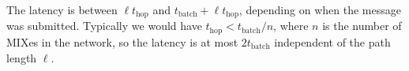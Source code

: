 \documentclass{llncs}
\begin{document}
The latency is between $\ell t_\mathrm{hop}$ and $t_\mathrm{batch} +
\ell t_\mathrm{hop}$, depending on when the message was submitted.
Typically we would have $t_\mathrm{hop} < t_\mathrm{batch}/n$, where
$n$ is the number of MIXes in the network, so the
latency is at most $2t_\mathrm{batch}$ independent of the path length
$\ell$.









\end{document}
